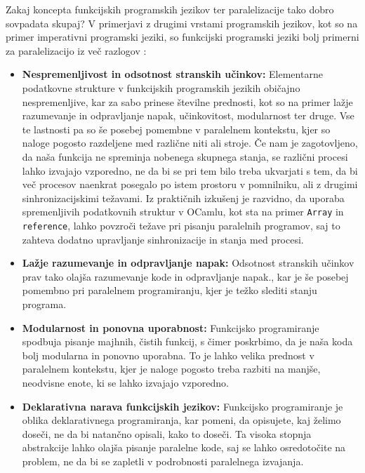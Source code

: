 \documentclass[mat1, tisk]{fmfdelo}
\begin{document}
Zakaj koncepta funkcijskih programskih jezikov ter paralelizacije tako dobro sovpadata skupaj?
V primerjavi z drugimi vrstami programskih jezikov, kot so na primer imperativni programski jeziki,
so funkcijski programski jeziki bolj primerni za paralelizacijo iz več razlogov 
\cite{linke_fundamental_2015, functional_parallel_graph_rewriting}:

\begin{itemize} \label{itemize:prednosti_funkcijskega_programiranja}
  \item \textbf{Nespremenljivost in odsotnost stranskih učinkov:} 
    Elementarne podatkovne strukture v funkcijskih programskih jezikih običajno nespremenljive, kar za sabo prinese številne
    prednosti, kot so na primer lažje razumevanje in odpravljanje napak, učinkovitost, modularnost 
    ter druge. Vse te lastnosti pa so še posebej pomembne v paralelnem kontekstu, kjer so naloge pogosto razdeljene med
    različne niti ali stroje. Če nam je zagotovljeno, da naša funkcija ne spreminja nobenega skupnega stanja, se
    različni procesi lahko izvajajo vzporedno, ne da bi se pri tem bilo treba ukvarjati s tem, da bi več procesov
    naenkrat posegalo po istem prostoru v pomnilniku, ali z drugimi sinhronizacijskimi težavami.
    Iz praktičnih izkušenj je razvidno, da uporaba spremenljivih podatkovnih struktur v OCamlu, kot sta na primer
    \texttt{Array} in \texttt{reference}, lahko povzroči težave pri pisanju paralelnih programov, saj to zahteva
    dodatno upravljanje sinhronizacije in stanja med procesi.

  \item \textbf{Lažje razumevanje in odpravljanje napak:} 
    Odsotnost stranskih učinkov prav tako olajša razumevanje kode in odpravljanje napak., kar je še posebej
    pomembno pri paralelnem programiranju, kjer je težko slediti stanju programa.

  \item \textbf{Modularnost in ponovna uporabnost:}
    Funkcijsko programiranje spodbuja pisanje majhnih, čistih funkcij, s čimer poskrbimo, da je naša koda bolj 
    modularna in ponovno uporabna. To je lahko velika prednost v paralelnem kontekstu,
    kjer je naloge pogosto treba razbiti na manjše, neodvisne enote, ki se lahko izvajajo vzporedno.

  \item \textbf{Deklarativna narava funkcijskih jezikov:} 
    Funkcijsko programiranje je oblika deklarativnega programiranja, kar pomeni, da opisujete, kaj želimo doseči, 
    ne da bi natančno opisali, kako to doseči. Ta visoka stopnja abstrakcije lahko olajša pisanje paralelne kode, 
    saj se lahko osredotočite na problem, ne da bi se zapletli v podrobnosti paralelnega izvajanja.
\end{itemize}
\end{document}
